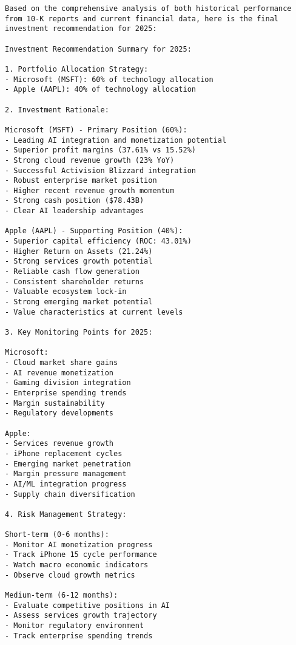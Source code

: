 \begin{lstlisting}[basicstyle=\ttfamily\footnotesize, frame=shadowbox, columns=fullflexible, breaklines=true, breakatwhitespace=true, breakindent=3pt, language=Prompt, xleftmargin=0.02\linewidth, xrightmargin=0.02\linewidth, caption={The report generated by AI-generated \textbf{Financial Agent}}, label={lst:fin_report}]
Based on the comprehensive analysis of both historical performance from 10-K reports and current financial data, here is the final investment recommendation for 2025:

Investment Recommendation Summary for 2025:

1. Portfolio Allocation Strategy:
- Microsoft (MSFT): 60% of technology allocation
- Apple (AAPL): 40% of technology allocation

2. Investment Rationale:

Microsoft (MSFT) - Primary Position (60%):
- Leading AI integration and monetization potential
- Superior profit margins (37.61% vs 15.52%)
- Strong cloud revenue growth (23% YoY)
- Successful Activision Blizzard integration
- Robust enterprise market position
- Higher recent revenue growth momentum
- Strong cash position ($78.43B)
- Clear AI leadership advantages

Apple (AAPL) - Supporting Position (40%):
- Superior capital efficiency (ROC: 43.01%)
- Higher Return on Assets (21.24%)
- Strong services growth potential
- Reliable cash flow generation
- Consistent shareholder returns
- Valuable ecosystem lock-in
- Strong emerging market potential
- Value characteristics at current levels

3. Key Monitoring Points for 2025:

Microsoft:
- Cloud market share gains
- AI revenue monetization
- Gaming division integration
- Enterprise spending trends
- Margin sustainability
- Regulatory developments

Apple:
- Services revenue growth
- iPhone replacement cycles
- Emerging market penetration
- Margin pressure management
- AI/ML integration progress
- Supply chain diversification

4. Risk Management Strategy:

Short-term (0-6 months):
- Monitor AI monetization progress
- Track iPhone 15 cycle performance
- Watch macro economic indicators
- Observe cloud growth metrics

Medium-term (6-12 months):
- Evaluate competitive positions in AI
- Assess services growth trajectory
- Monitor regulatory environment
- Track enterprise spending trends


\end{lstlisting}

